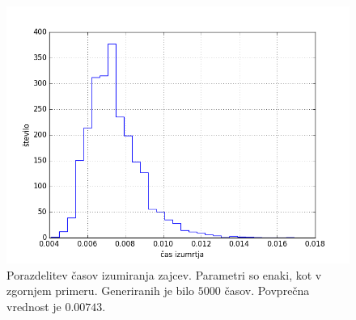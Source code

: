 \documentclass[slovene,11pt,a4paper]{article}
\numberwithin{equation}{section} %
\numberwithin{figure}{section} %
\numberwithin{table}{section} %
\begin{document}
\begin{figure}[h]
\begin{center}
\begin{minipage}{\textwidth}
\centering
\includegraphics[scale=0.6]{slike/porazdelitev_zajcki_izumrli_cas.png}
\end{minipage}\hfill
\end{center}
\caption{Porazdelitev časov izumiranja zajcev. Parametri so enaki, kot v zgornjem primeru. Generiranih je bilo $5000$ časov. Povprečna vrednost je $0.00743$.}
\end{figure}
\end{document}
